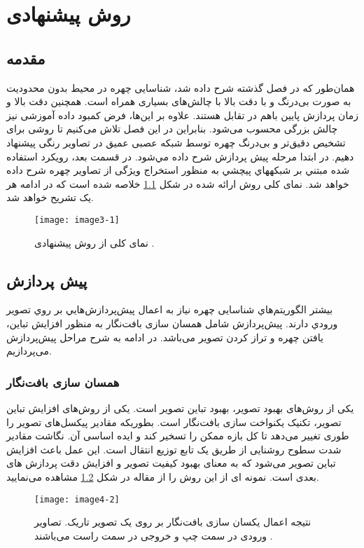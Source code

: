 \chapter{ روش پیشنهادی }
\section{مقدمه}

همان‌طور که در فصل‌ گذشته شرح داده شد، شناسایی چهره در محیط بدون محدودیت به صورت بی‌درنگ و با دقت بالا با چالش‌های بسیاری همراه است. همچنین دقت بالا و زمان پردازش پایین باهم در تقابل هستند. علاوه بر این‌ها، فرض ‌کمبود داده آموزشی نیز چالش بزرگی محسوب می‌شود. بنابراین در این فصل تلاش می‌کنیم تا روشی برای تشخیص دقیق‌تر و بی‌درنگ چهره توسط شبکه عصبی عمیق در تصاویر رنگی پیشنهاد دهیم. در ابتدا مرحله پيش پردازش شرح داده مي‌شود. در قسمت بعد، رويكرد استفاده شده مبتني بر شبكههاي پيچشي به منظور استخراج ویژگی از تصاوير چهره شرح داده خواهد شد. نمای کلی روش ارائه شده در شكل \ref{image4-1} خلاصه شده است كه در ادامه هر يک تشريح خواهد شد. 
\begin{figure}[h]
\centering
  \texttt{[image: image3-1]}
  \caption{نمای کلی از روش پیشنهادی \cite{ref1}.}
  \label{image4-1}
\end{figure}

\section{پیش پردازش}
بيشتر الگوريتم‌ها‌ي شناسایی چهره نياز به اعمال پيش‌پردازش‌هايي بر روي تصوير ورودي دارند. پیش‌پردازش شامل همسان سازی بافت‌نگار به منظور افزایش تباین، یافتن چهره و تراز کردن تصویر می‌باشد. در ادامه به شرح مراحل پیش‌پردازش می‌پردازیم.
\subsection{همسان سازی بافت‌نگار}
یکی از روش‌های بهبود تصویر، بهبود تباین تصویر است. یکی از روش‌های افزایش تباین تصویر، تکنیک یکنواخت سازی بافت‌نگار است. بطوریکه مقادیر پیکسل‌های تصویر را طوری تغییر می‌دهد تا کل بازه ممکن را تسخیر کند و ایده اساسی آن. نگاشت مقادیر شدت سطوح روشنایی از طریق یک تابع توزیع انتقال است.
این عمل باعث افزایش تباین تصویر  می‌شود که به معنای بهبود کیفیت تصویر و افزایش دقت پردازش های بعدی است. نمونه ای از این روش را از مقاله \cite{s18092995} در شکل \ref{image4-2}  مشاهده می‌نمایید.

\begin{figure}[h]
\centering
\texttt{[image: image4-2]}
\caption{نتیجه اعمال یکسان سازی بافت‌نگار بر روی یک تصویر تاریک. تصاویر ورودی در سمت چپ و خروجی در سمت راست می‌باشند \cite{s18092995}.}
\label{image4-2}
\end{figure}

